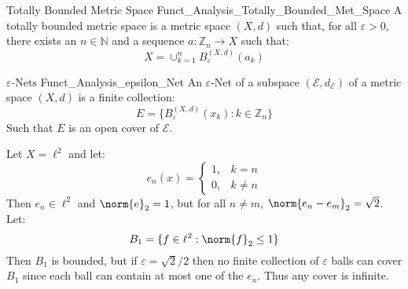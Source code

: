             \begin{ldefinition}{Totally Bounded Metric Space}
                  {Funct_Analysis_Totally_Bounded_Met_Space}
                A totally bounded metric space is a metric
                space $(X,d)$ such that, for all $\varepsilon>0$,
                there exists an $n\in\mathbb{N}$ and a sequence
                $a:\mathbb{Z}_{n}\rightarrow{X}$ such that:
                \begin{equation}
                    X=\cup_{k=1}^{n}B_{\varepsilon}^{(X,d)}(a_{k})
                \end{equation}
            \end{ldefinition}
            \begin{ldefinition}{$\varepsilon\textrm{-Nets}$}
                  {Funct_Analysis_epsilon_Net}
                An $\varepsilon\textrm{-Net}$ of a subspace
                $(\mathcal{E},d_{\mathcal{E}})$ of a
                metric space $(X,d)$ is a finite collection:
                \begin{equation}
                    E=\{B_{\varepsilon}^{(X,d)}(x_{k}):
                        k\in\mathbb{Z}_{n}\}
                \end{equation}
                Such that $E$ is an open cover of $\mathcal{E}$.
            \end{ldefinition}
            \begin{lexample}
                Let $X=\ell^{2}$ and let:
                \begin{equation}
                    e_{n}(x)=
                    \begin{cases}
                        1,&k=n\\
                        0,&k\ne{n}
                    \end{cases}
                \end{equation}
                Then $e_{n}\in\ell^{2}$ and $\norm{e}_{2}=1$,
                but for all $n\ne{m}$,
                $\norm{e_{n}-e_{m}}_{2}=\sqrt{2}$. Let:
                \begin{equation}
                    B_{1}=\{f\in\ell^{2}:\norm{f}_{2}\leq{1}\}
                \end{equation}
                Then $B_{1}$ is bounded, but if
                $\varepsilon=\sqrt{2}/2$ then no finite collection
                of $\varepsilon$ balls can cover $B_{1}$ since
                each ball can contain at most one of the
                $e_{n}$. Thus any cover is infinite.
            \end{lexample}
